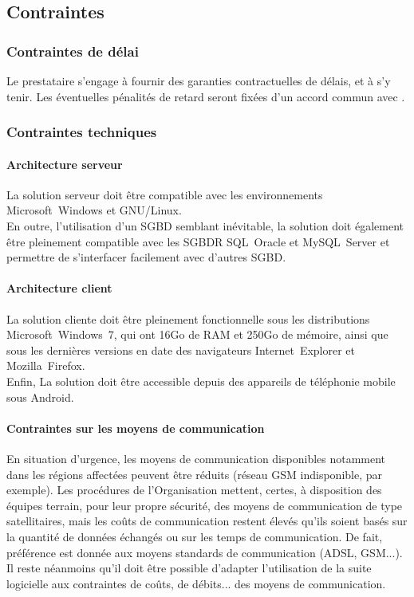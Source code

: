 \subsection{Contraintes}

\subsubsection{Contraintes de délai}
Le prestataire s'engage à fournir des garanties contractuelles de délais, et à s'y tenir. Les éventuelles pénalités de retard seront fixées d'un accord commun avec \mo.

\subsubsection{Contraintes techniques}

\paragraph{Architecture serveur}
La solution serveur doit être compatible avec les environnements Microsoft~Windows et GNU/Linux.
\\
En outre, l'utilisation d'un SGBD semblant inévitable, la solution doit également être pleinement compatible avec les SGBDR SQL~Oracle et MySQL~Server et permettre de s'interfacer facilement avec d'autres SGBD.

\paragraph{Architecture client}
La solution cliente doit être pleinement fonctionnelle sous les distributions Microsoft~Windows~7, qui ont 16Go de RAM et 250Go de mémoire, ainsi que sous les dernières versions en date des navigateurs Internet~Explorer et Mozilla~Firefox.
\\
Enfin, La solution doit être accessible depuis des appareils de téléphonie mobile sous Android.

\paragraph{Contraintes sur les moyens de communication}
En situation d'urgence, les moyens de communication disponibles notamment dans les régions affectées peuvent être \og{}réduits\fg{} (réseau GSM indisponible, par exemple). Les procédures de l'Organisation mettent, certes, à disposition des équipes terrain, pour leur propre sécurité, des moyens de communication de type satellitaires, mais les coûts de communication restent élevés qu'ils soient basés sur la quantité de données échangés ou sur les temps de communication. De fait, préférence est donnée aux moyens \og{}standards\fg{} de communication (ADSL, GSM...). Il reste néanmoins qu'il doit être possible d'adapter l'utilisation de la suite logicielle aux contraintes de coûts, de débits... des moyens de communication.

